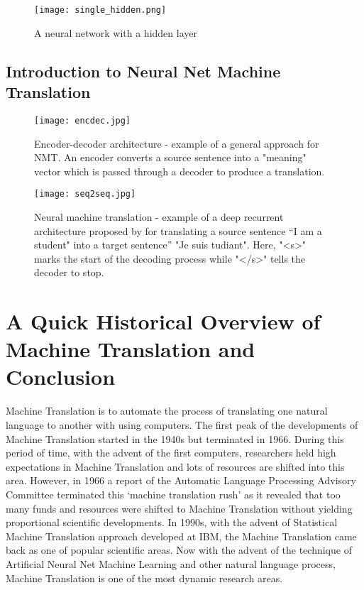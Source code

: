 \begin{figure}[h]
\caption{A neural network with a hidden layer \citep[p8]{Koehn_NMT2017}}
\centering
\texttt{[image: single\_hidden.png]}
\end{figure}  


\subsection{Introduction to Neural Net Machine Translation}

\begin{figure}[h]
\caption{Encoder-decoder architecture - example of a general approach for NMT. An encoder converts a source sentence into a "meaning" vector which is passed through a decoder to produce a translation. \citep{luong17GitHub}}
\centering
\texttt{[image: encdec.jpg]}
\end{figure} 


\begin{figure}[h]
\caption{Neural machine translation - example of a deep recurrent architecture proposed by for translating a source sentence ``I am a student" into a target sentence'' "Je suis tudiant". Here, "<s>" marks the start of the decoding process while "</s>" tells the decoder to stop. \citep{luong17GitHub}}
\centering
\texttt{[image: seq2seq.jpg]}
\end{figure} 


\section{A Quick Historical Overview of Machine Translation and Conclusion}

Machine Translation is to automate the process of translating one natural language to another with using computers. The first peak of the developments of Machine Translation started in the 1940s but terminated in 1966. During this period of time, with the advent of the first computers, researchers held high expectations in Machine Translation and lots of resources are shifted into this area. However, in 1966 a report of the Automatic Language Processing Advisory Committee \citep{pierce1966language} terminated this `machine translation rush' as it revealed that too many funds and resources were shifted to Machine Translation without yielding proportional scientific developments. In 1990s, with the advent of Statistical Machine Translation approach developed at IBM, the Machine Translation came back as one of popular scientific areas. Now with the advent of the technique of Artificial Neural Net Machine Learning and other natural language process, Machine Translation is one of the most dynamic research areas.    
